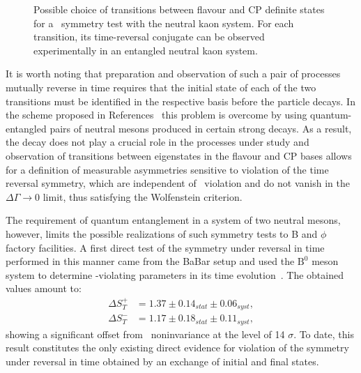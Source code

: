 \begin{figure}[h!]
  \centering
  \caption{Possible choice of transitions between flavour and CP definite states for a \Ts~symmetry test with the neutral kaon system. For each transition, its time-reversal conjugate can be observed experimentally in an entangled neutral kaon system.}
  \label{fig:transitions}
\end{figure}

It is worth noting that preparation and observation of such a pair of processes mutually reverse in time requires that the initial state of each of the two transitions must be identified in the respective basis before the particle decays. In the scheme proposed in References~\cite{babar_theory, theory:bernabeu-t} this problem is overcome by using quantum-entangled pairs of neutral mesons produced in certain strong decays. As a result, the decay does not play a crucial role in the processes under study and observation of transitions between eigenstates in the flavour and CP bases  allows for a definition of measurable asymmetries sensitive to violation of the time reversal symmetry, which are independent of \CPs~violation and do not vanish in the $\Delta \Gamma \to 0$ limit, thus satisfying the Wolfenstein criterion. 

The requirement of quantum entanglement in a system of two neutral mesons, however, limits the possible realizations of such symmetry tests to B and $\phi$ factory facilities. A first direct test of the symmetry under reversal in time performed in this manner came from the BaBar setup and used the $\mathrm{B}^0$ meson system to determine \Ts-violating parameters in its time evolution~\cite{t_violation_babar}. The obtained values amount to:
\begin{eqnarray}
  \label{eq:babar_results}
  \Delta S^+_T & = 1.37 \pm 0.14_{stat} \pm 0.06_{syst}, \\
  \Delta S^-_T & = 1.17 \pm 0.18_{stat} \pm 0.11_{syst},
\end{eqnarray}
showing a significant offset from \Ts~noninvariance at the level of 14 $\sigma$. To date, this result constitutes the only existing direct evidence for violation of the symmetry under reversal in time obtained by an exchange of initial and final states.

